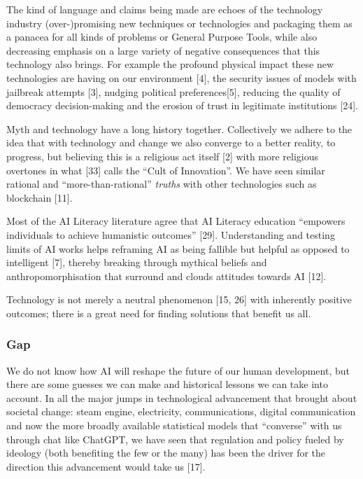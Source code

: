 \documentclass[
  letterpaper,
  DIV=11,
  numbers=noendperiod]{scrartcl}
\begin{document}
The kind of language and claims being made are echoes of the technology
industry (over-)promising new techniques or technologies and packaging
them as a panacea for all kinds of problems or General Purpose Tools,
while also decreasing emphasis on a large variety of negative
consequences that this technology also brings. For example the profound
physical impact these new technologies are having on our environment
{[}4{]}, the security issues of models with jailbreak attempts {[}3{]},
nudging political preferences{[}5{]}, reducing the quality of democracy
decision-making and the erosion of trust in legitimate institutions
{[}24{]}.

Myth and technology have a long history together. Collectively we adhere
to the idea that with technology and change we also converge to a better
reality, to progress, but believing this is a religious act itself
{[}2{]} with more religious overtones in what {[}33{]} calls the ``Cult
of Innovation''. We have seen similar rational and
``more-than-rational'' \emph{truths} with other technologies such as
blockchain {[}11{]}.

Most of the AI Literacy literature agree that AI Literacy education
``empowers individuals to achieve humanistic outcomes'' {[}29{]}.
Understanding and testing limits of AI works helps reframing AI as being
fallible but helpful as opposed to intelligent {[}7{]}, thereby breaking
through mythical beliefs and anthropomorphisation that surround and
clouds attitudes towards AI {[}12{]}.

Technology is not merely a neutral phenomenon {[}15, 26{]} with
inherently positive outcomes; there is a great need for finding
solutions that benefit us all.

\subsubsection{Gap}\label{gap}

We do not know how AI will reshape the future of our human development,
but there are some guesses we can make and historical lessons we can
take into account. In all the major jumps in technological advancement
that brought about societal change: steam engine, electricity,
communications, digital communication and now the more broadly available
statistical models that ``converse'' with us through chat like ChatGPT,
we have seen that regulation and policy fueled by ideology (both
benefiting the few or the many) has been the driver for the direction
this advancement would take us {[}17{]}.
\end{document}

